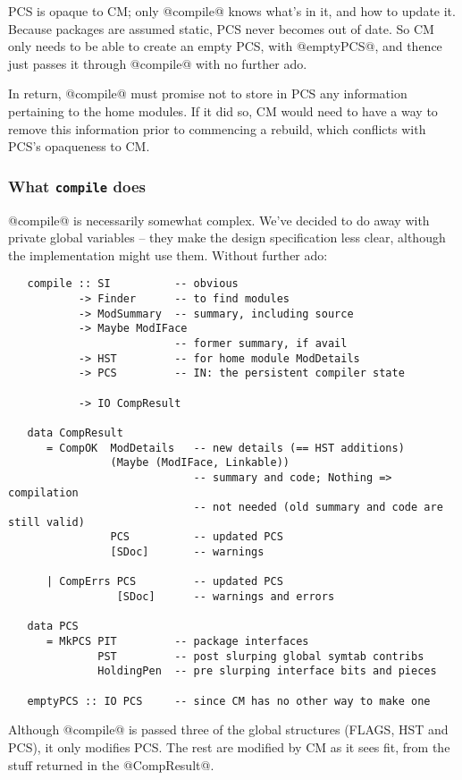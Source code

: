 \documentclass[11pt]{article}
\begin{document}
   PCS is opaque to CM; only @compile@ knows what's in it, and how to
   update it.  Because packages are assumed static, PCS never becomes
   out of date.  So CM only needs to be able to create an empty PCS,
   with @emptyPCS@, and thence just passes it through @compile@ with
   no further ado.

   In return, @compile@ must promise not to store in PCS any
   information pertaining to the home modules.  If it did so, CM would
   need to have a way to remove this information prior to commencing a
   rebuild, which conflicts with PCS's opaqueness to CM.




\subsubsection{What {\tt compile} does}
@compile@ is necessarily somewhat complex.  We've decided to do away
with private global variables -- they make the design specification
less clear, although the implementation might use them.  Without
further ado:
\begin{verbatim}
   compile :: SI          -- obvious
           -> Finder      -- to find modules
           -> ModSummary  -- summary, including source
           -> Maybe ModIFace
                          -- former summary, if avail
           -> HST         -- for home module ModDetails
           -> PCS         -- IN: the persistent compiler state

           -> IO CompResult

   data CompResult
      = CompOK  ModDetails   -- new details (== HST additions)
                (Maybe (ModIFace, Linkable))
                             -- summary and code; Nothing => compilation
                             -- not needed (old summary and code are still valid)
                PCS          -- updated PCS
                [SDoc]       -- warnings

      | CompErrs PCS         -- updated PCS
                 [SDoc]      -- warnings and errors

   data PCS
      = MkPCS PIT         -- package interfaces
              PST         -- post slurping global symtab contribs
              HoldingPen  -- pre slurping interface bits and pieces

   emptyPCS :: IO PCS     -- since CM has no other way to make one
\end{verbatim}
Although @compile@ is passed three of the global structures (FLAGS,
HST and PCS), it only modifies PCS.  The rest are modified by CM as it
sees fit, from the stuff returned in the @CompResult@.
\end{document}

